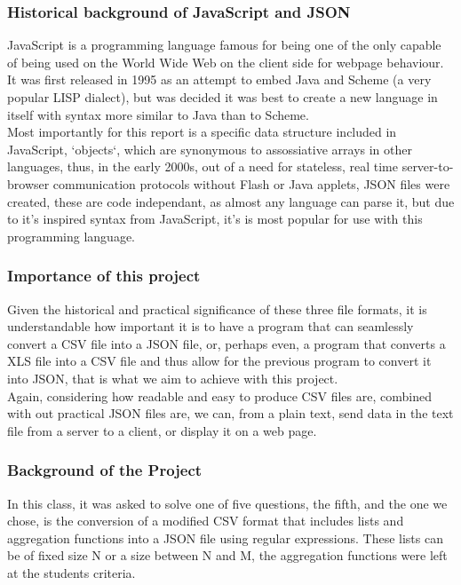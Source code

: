 \documentclass[11pt,a4paper,times]{report}
\begin{document}
\subsubsection*{Historical background of JavaScript and JSON}JavaScript is a 
programming language famous for being one of the only capable of being used 
on the World Wide Web on the client side for webpage behaviour.
It was first released in 1995 as an attempt to embed Java and Scheme
(a very popular LISP dialect), but was decided it was best to create
a new language in itself with syntax more similar to Java than to Scheme.
\\
Most importantly for this report is a specific data structure included in 
JavaScript, `objects`, which are synonymous to assossiative arrays
in other languages, thus, in the early 2000s, out of a need for stateless,
real time server-to-browser communication protocols without Flash or
Java applets, JSON files were created, these are code independant,
as almost any language can parse it, but due to it's inspired syntax from JavaScript,
it's is most popular for use with this programming language.

\subsubsection*{Importance of this project}Given the historical and practical
significance of these three file formats, it is understandable how important
it is to have a program that can seamlessly convert a CSV file into a JSON file,
or, perhaps even, a program that converts a XLS file into a CSV file and thus allow
for the previous program to convert it into JSON, that is what we aim to achieve with this project.
\\
Again, considering how readable and easy to produce CSV files are, combined with out practical JSON files
are, we can, from a plain text, send data in the text file from a server to a client, or display it on a web page.


\subsubsection*{Background of the Project}In this class, it was asked to solve
one of five questions, the fifth, and the one we chose, is the conversion of a
modified CSV format that includes lists and aggregation functions into a JSON file
using regular expressions. These lists can be of fixed size N or a size between N and M,
the aggregation functions were left at the students criteria.
\end{document}

